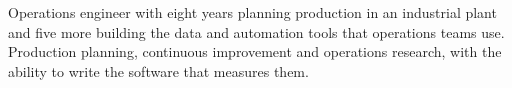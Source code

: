 Operations engineer with eight years planning production in an industrial plant and five more building
the data and automation tools that operations teams use. Production planning, continuous improvement and
operations research, with the ability to write the software that measures them.
